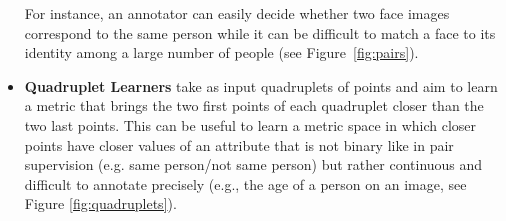 \documentclass[twoside,11pt]{article}
\begin{document}
\begin{itemize}
For instance, an annotator can easily decide whether two face images correspond to the same person while it can be difficult to match a face to its identity among a large number of people (see Figure~\ref{fig:pairs}). 
\item \textbf{Quadruplet Learners} take as input quadruplets of points and aim to learn a metric that brings the two first points of each quadruplet closer than the two last points. This can be useful to learn a metric space in which closer points have closer values of an attribute that is not binary like in pair supervision (e.g. same person/not same person) but rather continuous and difficult to annotate precisely (e.g., the age of a person on an image, see Figure \ref{fig:quadruplets}).
\end{itemize}
\end{document}
